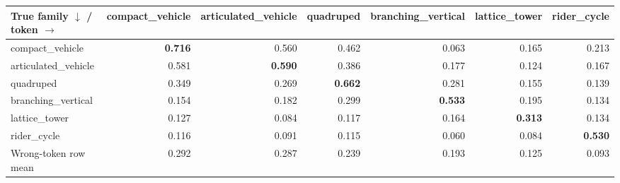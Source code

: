 \begin{tabular}{@{}lrrrrrr@{}}
\toprule
True family $\downarrow$ / token $\rightarrow$ & compact\_vehicle & articulated\_vehicle & quadruped & branching\_vertical & lattice\_tower & rider\_cycle \\
\midrule
compact\_vehicle & \textbf{0.716} & 0.560 & 0.462 & 0.063 & 0.165 & 0.213 \\
articulated\_vehicle & 0.581 & \textbf{0.590} & 0.386 & 0.177 & 0.124 & 0.167 \\
quadruped & 0.349 & 0.269 & \textbf{0.662} & 0.281 & 0.155 & 0.139 \\
branching\_vertical & 0.154 & 0.182 & 0.299 & \textbf{0.533} & 0.195 & 0.134 \\
lattice\_tower & 0.127 & 0.084 & 0.117 & 0.164 & \textbf{0.313} & 0.134 \\
rider\_cycle & 0.116 & 0.091 & 0.115 & 0.060 & 0.084 & \textbf{0.530} \\
\midrule
Wrong-token row mean & 0.292 & 0.287 & 0.239 & 0.193 & 0.125 & 0.093 \\
\bottomrule
\end{tabular}
